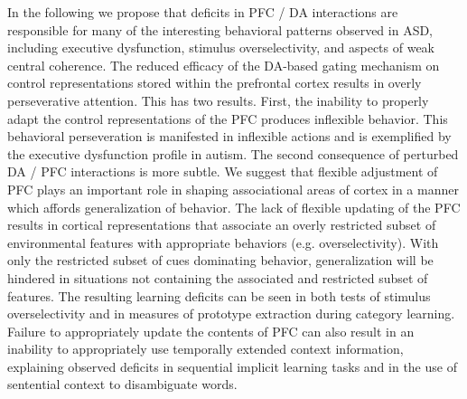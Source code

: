 \documentclass[man]{apa}
\begin{document}


In the following we propose that deficits in PFC / DA interactions are responsible for many of the interesting behavioral patterns observed in ASD, including executive dysfunction, stimulus overselectivity, and aspects of weak central coherence.  The reduced efficacy of the DA-based gating mechanism on control representations stored within the prefrontal cortex results in overly perseverative attention.  This has two results.  First, the inability to properly adapt the control representations of the PFC produces inflexible behavior.  This behavioral perseveration is manifested in inflexible actions and is exemplified by the executive dysfunction profile in autism.  The second consequence of perturbed DA / PFC interactions is more subtle. We suggest that flexible adjustment of PFC plays an important role in shaping associational areas of cortex in a manner which affords generalization of behavior.  The lack of flexible updating of the PFC results in cortical representations that associate an overly restricted subset of environmental features with appropriate behaviors (e.g. overselectivity).  With only the restricted subset of cues dominating behavior, generalization will be hindered in situations not containing the associated and restricted subset of features.  The resulting learning deficits can be seen in both tests of stimulus overselectivity and in measures of prototype extraction during category learning.  Failure to appropriately update the contents of PFC can also result in an inability to appropriately use temporally extended context information, explaining observed deficits in sequential implicit learning tasks and in the use of sentential context to disambiguate words. 
\end{document}
